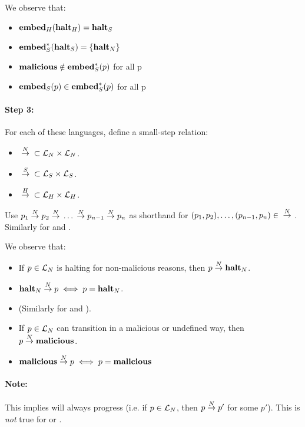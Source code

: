 We observe that:

\begin{itemize}
\item ${{\mathbf{embed}}_H}({\mathbf{halt}_H}) = {\mathbf{halt}_S}$
\item ${\mathbf{embed}^\ast_S}({\mathbf{halt}_S}) = \{{\mathbf{halt}_N}\}$
\item ${\mathbf{malicious}} \notin {\ensuremath{\mathbf{embed}^\ast_S}}(p)$ for all p
\item ${{\mathbf{embed}}_S}(p) \in {\ensuremath{\mathbf{embed}^\ast_S}}(p)$ for all p
\end{itemize}

\paragraph{Step 3:} For each of these languages, define a small-step relation:

\begin{itemize}
\item ${{}\stackrel{N}{->}{}} \subset \mathcal{L}_N \times \mathcal{L}_N$.
\item ${{}\stackrel{S}{->}{}} \subset \mathcal{L}_S \times \mathcal{L}_S$.
\item ${{}\stackrel{H}{->}{}} \subset \mathcal{L}_H \times \mathcal{L}_H$.
\end{itemize}

Use $p_1 {{}\stackrel{N}{->}{}} p_2 {{}\stackrel{N}{->}{}} \dots {{}\ensuremath{\stackrel{N}{->}}{}} p_{n-1} {{}\stackrel{N}{->}{}} p_n$
as shorthand for $(p_1, p_2), \dots, (p_{n-1}, p_n) \in {{}\ensuremath{\stackrel{N}{->}}{}}$. Similarly
for \simpleo{->} and \higho{->}.

We observe that:

\begin{itemize}
\item If $p \in \mathcal{L}_N$ is halting for non-malicious reasons, then
  $p {{}\stackrel{N}{->}{}} {\mathbf{halt}_N}$.
\item ${\mathbf{halt}_N} {{}\stackrel{N}{->}{}} p \iff p = {\mathbf{halt}_N}$.
\item (Similarly for \simplelang and \highlang).
\item If $p \in \mathcal{L}_N$ can transition in a malicious or undefined way,
  then $p {{}\stackrel{N}{->}{}} {\mathbf{malicious}}$.
\item ${\mathbf{malicious}} {{}\stackrel{N}{->}{}} p \iff p = {\mathbf{malicious}}$
\end{itemize}

\paragraph{Note:} This implies \nativelang will always progress (i.e. if
$p \in \mathcal{L}_N$, then $p {{}\stackrel{N}{->}{}} p'$ for some $p'$). This is \emph{not}
true for \simplelang or \highlang.

